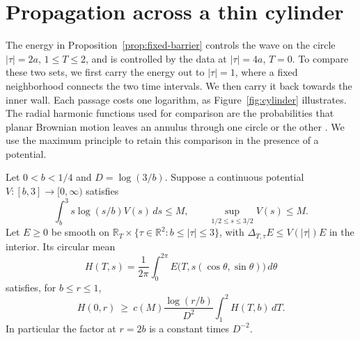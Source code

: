 \section{Propagation across a thin cylinder}\label{sec:propagation}

The energy in Proposition~\ref{prop:fixed-barrier} controls the wave on the
circle $|\tau|=2a$, $1\le T\le2$, and is controlled by the data at
$|\tau|=4a$, $T=0$. To compare these two sets, we first carry the energy
out to $|\tau|=1$, where a fixed neighborhood connects the two time
intervals. We then carry it back towards the inner wall. Each passage
costs one logarithm, as Figure~\ref{fig:cylinder} illustrates.
The radial harmonic functions used for comparison are the probabilities
that planar Brownian motion leaves an annulus through one circle or
the other \cite[Theorem~3.18]{MoertersPeres2010}. We use the maximum
principle to retain this comparison in the presence of a potential.

\begin{lemma}\label{lem:cylinder}
Let $0<b<1/4$ and $D=\log(3/b)$. Suppose a continuous potential
$V:[b,3]\to[0,\infty)$ satisfies
\begin{equation}\label{eq:cylinder-moment}
 \int_b^3 s\log(s/b)V(s)\,ds\le M,\qquad
 \sup_{1/2\le s\le3/2} V(s)\le M .
\end{equation}
Let $E\ge0$ be smooth on $\mathbb R_T\times
\{\tau\in\mathbb R^2:b\le|\tau|\le3\}$, with
$\Delta_{T,\tau}E\le V(|\tau|)E$ in the interior. Its circular mean
\[
 H(T,s)=\frac1{2\pi}\int_0^{2\pi}
 E\bigl(T,s(\cos\theta,\sin\theta)\bigr)\,d\theta
\]
satisfies, for $b\le r\le1$,
\begin{equation}\label{eq:cylinder-propagation}
 H(0,r)\ \ge\ c(M)\frac{\log(r/b)}{D^2}\int_1^2 H(T,b)\,dT .
\end{equation}
In particular the factor at $r=2b$ is a constant times $D^{-2}$.
\end{lemma}



